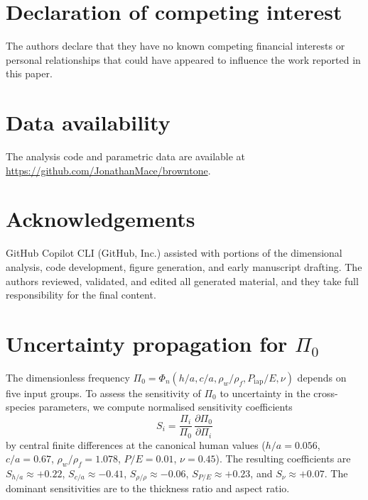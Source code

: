 \documentclass[review]{elsarticle}
\begin{document}
\section*{Declaration of competing interest}
The authors declare that they have no known competing financial interests
or personal relationships that could have appeared to influence the work
reported in this paper.

\section*{Data availability}
The analysis code and parametric data are available at
\url{https://github.com/JonathanMace/browntone}.

\section*{Acknowledgements}
GitHub Copilot CLI (GitHub, Inc.) assisted with portions of the dimensional
analysis, code development, figure generation, and early manuscript drafting.
The authors reviewed, validated, and edited all generated material, and they
take full responsibility for the final content.




\appendix

\section{Uncertainty propagation for $\Pi_0$}
\label{app:uncertainty}

The dimensionless frequency $\Pi_0 = \Phi_n(h/a, c/a, \rho_w/\rho_f,
P_\mathrm{iap}/E, \nu)$ depends on five input groups.  To assess the
sensitivity of $\Pi_0$ to uncertainty in the cross-species parameters, we
compute normalised sensitivity coefficients
\begin{equation}
  S_i = \frac{\Pi_i}{\Pi_0}\,\frac{\partial \Pi_0}{\partial \Pi_i}
\end{equation}
by central finite differences at the canonical human values ($h/a = 0.056$,
$c/a = 0.67$, $\rho_w/\rho_f = 1.078$, $P/E = 0.01$, $\nu = 0.45$).
The resulting coefficients are $S_{h/a} \approx +0.22$,
$S_{c/a} \approx -0.41$, $S_{\rho/\rho} \approx -0.06$,
$S_{P/E} \approx +0.23$, and $S_\nu \approx +0.07$.  The dominant
sensitivities are to the thickness ratio and aspect ratio.
\end{document}
